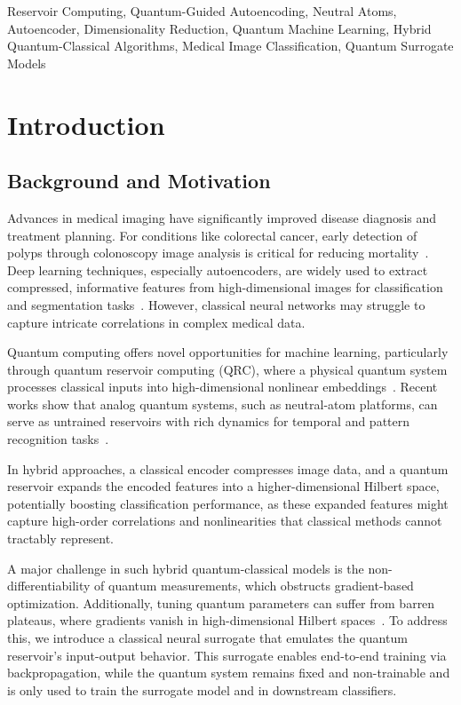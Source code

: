 \documentclass[conference]{IEEEtran}
\begin{document}
\begin{IEEEkeywords}
Reservoir Computing, Quantum-Guided Autoencoding,
Neutral Atoms, Autoencoder, Dimensionality Reduction, 
Quantum Machine Learning, Hybrid Quantum-Classical Algorithms, 
Medical Image Classification, Quantum Surrogate Models
\end{IEEEkeywords}

\section{Introduction}

\subsection{Background and Motivation}
Advances in medical imaging have significantly improved 
disease diagnosis and treatment planning. For conditions 
like colorectal cancer, early detection of polyps through 
colonoscopy image analysis is critical for reducing mortality~\cite{estevaGuideDeepLearning2019}. 
Deep learning techniques, especially autoencoders, are widely 
used to extract compressed, informative features from 
high-dimensional images for classification and segmentation 
tasks~\cite{bengioLearningDeepArchitectures}. However, classical neural networks may struggle 
to capture intricate correlations in complex medical data.

Quantum computing offers novel opportunities 
for machine learning, particularly through quantum reservoir 
computing (QRC), where a physical quantum system processes 
classical inputs into high-dimensional nonlinear embeddings~\cite{tanakaRecentAdvancesPhysical2019,fujiiHarnessingDisorderedQuantum2017}. Recent works show that analog quantum systems, such as neutral-atom platforms, can serve as untrained reservoirs with rich dynamics for temporal and pattern recognition tasks~\cite{domingoOptimalQuantumReservoir2022,kornjavcaLargescaleQuantumReservoir2024}. 

In hybrid approaches, a classical encoder compresses image data, and a quantum reservoir expands the encoded features into a higher-dimensional Hilbert space, potentially boosting classification performance, as these expanded features might capture high-order correlations and nonlinearities that classical methods cannot tractably represent.

A major challenge in such hybrid quantum-classical models is the non-differentiability of quantum measurements, which obstructs gradient-based optimization. Additionally, tuning quantum parameters can suffer from barren plateaus, where gradients vanish in high-dimensional Hilbert spaces~\cite{mccleanBarrenPlateausQuantum2018}. To address this, we introduce a classical neural surrogate that emulates the quantum reservoir's input-output behavior. 
This surrogate enables end-to-end training via backpropagation, while the quantum system remains fixed and non-trainable and is only used to train the surrogate model and in downstream classifiers.
\end{document}
